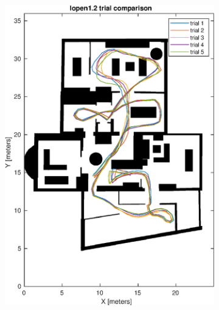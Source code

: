 \begin{figure}[H]
\begin{subfigure}[t]{.45\textwidth}
	\includegraphics[width=\linewidth]{images/20201107_1142_trial_comparison_2}
	\caption{}
	\label{fig:202011071142trialcomparison2}
\end{subfigure}
\end{figure}

